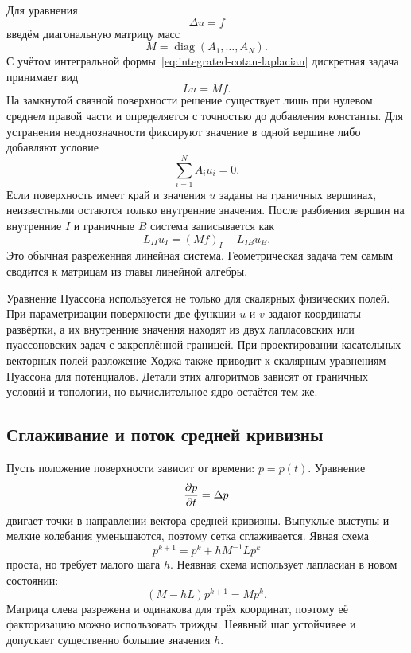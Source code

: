 Для уравнения
\[
\Delta u=f
\]
введём диагональную матрицу масс
\begin{equation}
\label{eq:mesh-mass-matrix}
M=\operatorname{diag}(A_1,\ldots,A_N).
\end{equation}
С учётом интегральной формы~\eqref{eq:integrated-cotan-laplacian} дискретная задача принимает вид
\begin{equation}
\label{eq:mesh-poisson-system}
Lu=Mf.
\end{equation}
На замкнутой связной поверхности решение существует лишь при нулевом среднем правой части и определяется с точностью до добавления константы. Для устранения неоднозначности фиксируют значение в одной вершине либо добавляют условие
\[
\sum_{i=1}^NA_i u_i=0.
\]
Если поверхность имеет край и значения \(u\) заданы на граничных вершинах, неизвестными остаются только внутренние значения. После разбиения вершин на внутренние \(I\) и граничные \(B\) система записывается как
\begin{equation}
\label{eq:dirichlet-block-system}
L_{II}u_I
=(Mf)_I-L_{IB}u_B.
\end{equation}
Это обычная разреженная линейная система. Геометрическая задача тем самым сводится к матрицам из главы линейной алгебры.

Уравнение Пуассона используется не только для скалярных физических полей. При параметризации поверхности две функции \(u\) и \(v\) задают координаты развёртки, а их внутренние значения находят из двух лапласовских или пуассоновских задач с закреплённой границей. При проектировании касательных векторных полей разложение Ходжа также приводит к скалярным уравнениям Пуассона для потенциалов. Детали этих алгоритмов зависят от граничных условий и топологии, но вычислительное ядро остаётся тем же.

\subsection{Сглаживание и поток средней кривизны}

Пусть положение поверхности зависит от времени: \(p=p(t)\). Уравнение
\begin{equation}
\label{eq:mean-curvature-flow-smooth}
\frac{\partial p}{\partial t}=\Delta p
\end{equation}
двигает точки в направлении вектора средней кривизны. Выпуклые выступы и мелкие колебания уменьшаются, поэтому сетка сглаживается. Явная схема
\[
p^{k+1}=p^k+hM^{-1}Lp^k
\]
проста, но требует малого шага \(h\). Неявная схема использует лапласиан в новом состоянии:
\begin{equation}
\label{eq:implicit-mean-curvature-flow}
\boxed{
(M-hL)p^{k+1}=Mp^k.
}
\end{equation}
Матрица слева разрежена и одинакова для трёх координат, поэтому её факторизацию можно использовать трижды. Неявный шаг устойчивее и допускает существенно большие значения \(h\).

